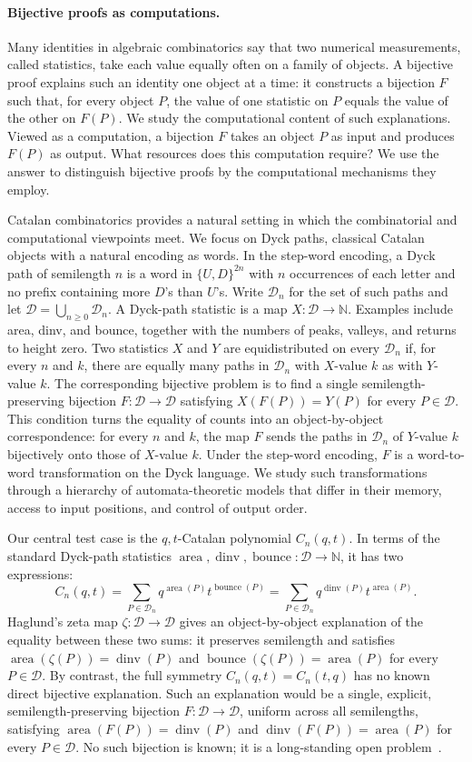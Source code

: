 \documentclass[11pt]{article}
\theoremstyle{definition}
\newcommand{\D}{\mathcal D}
\newcommand{\N}{\mathbb N}
\newcommand{\area}{\operatorname{area}}
\newcommand{\dinv}{\operatorname{dinv}}
\newcommand{\bounce}{\operatorname{bounce}}
\begin{document}
\paragraph{Bijective proofs as computations.}

Many identities in algebraic combinatorics say that two numerical
measurements, called statistics, take each value equally often on a family of
objects.  A bijective proof explains such an identity one object at a time: it
constructs a bijection $F$ such that, for every object $P$, the value of one
statistic on $P$ equals the value of the other on $F(P)$.  We study the
computational content of such explanations.  Viewed as a computation, a
bijection $F$ takes an object $P$ as input and produces $F(P)$ as output.  What
resources does this computation require?  We use the answer to distinguish
bijective proofs by the computational mechanisms they employ.

Catalan combinatorics provides a natural setting in which the combinatorial and
computational viewpoints meet.  We focus on Dyck paths, classical Catalan
objects with a natural encoding as words.  In the step-word encoding, a Dyck
path of semilength $n$ is a word in $\{U,D\}^{2n}$ with $n$ occurrences of each
letter and no prefix containing more $D$'s than $U$'s.  Write $\D_n$
for the set of such paths and let $\D=\bigcup_{n\ge 0}\D_n$.  A Dyck-path
statistic is a map $X\colon\D\to\N$.  Examples include area, dinv, and bounce,
together with the numbers of peaks, valleys, and returns to height zero.  Two
statistics $X$ and $Y$ are equidistributed on every $\D_n$ if, for every $n$
and $k$, there are equally many paths in $\D_n$ with $X$-value $k$ as with
$Y$-value $k$.  The corresponding bijective problem is to find a single
semilength-preserving bijection $F\colon\D\to\D$ satisfying
$X(F(P))=Y(P)$ for every $P\in\D$.  This condition turns the equality of counts
into an object-by-object correspondence: for every $n$ and $k$, the map $F$
sends the paths in $\D_n$ of $Y$-value $k$ bijectively onto those of $X$-value
$k$.  Under the step-word encoding, $F$ is a word-to-word transformation on the
Dyck language.  We study such transformations through a hierarchy of
automata-theoretic models that differ in their memory, access to input
positions, and control of output order.

Our central test case is the $q,t$-Catalan polynomial $C_n(q,t)$.  In terms of
the standard Dyck-path statistics
$\area,\dinv,\bounce\colon\D\to\N$, it has two expressions:
\[
   C_n(q,t)=\sum_{P\in\D_n} q^{\area(P)}t^{\bounce(P)}
   =
   \sum_{P\in\D_n} q^{\dinv(P)}t^{\area(P)}.
\]
Haglund's zeta map $\zeta\colon\D\to\D$ gives an object-by-object explanation
of the equality between these two sums: it preserves semilength and satisfies
$\area(\zeta(P))=\dinv(P)$ and $\bounce(\zeta(P))=\area(P)$ for every
$P\in\D$.  By contrast, the full symmetry $C_n(q,t)=C_n(t,q)$ has no known
direct bijective explanation.  Such an explanation would be a single,
explicit, semilength-preserving bijection $F\colon\D\to\D$, uniform across all
semilengths, satisfying $\area(F(P))=\dinv(P)$ and
$\dinv(F(P))=\area(P)$ for every $P\in\D$.  No such bijection is known; it is a
long-standing open problem~\cite{Pons2022}.
\end{document}
